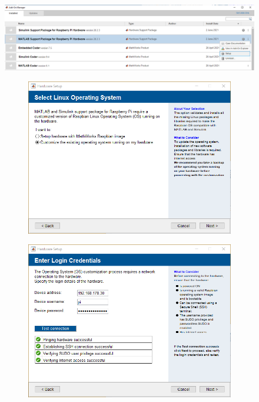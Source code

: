 \begin{figure}[ht]
	\centering
	\includegraphics[width=.8\linewidth]{Pictures/Setup RPi.png}  
	\caption{}
	\label{fig:setup}
\end{figure}

\begin{figure}[ht]
	\begin{subfigure}{.3\textwidth}
		\centering
		\includegraphics[width=.8\linewidth]{Pictures/Connect RPi 01.png}  
		\caption{}
		\label{fig:sub-first}
	\end{subfigure}
	\begin{subfigure}{.3\textwidth}
		\centering
		\includegraphics[width=.8\linewidth]{Pictures/Connect RPi 03.png}  

\end{subfigure}
\end{figure}
